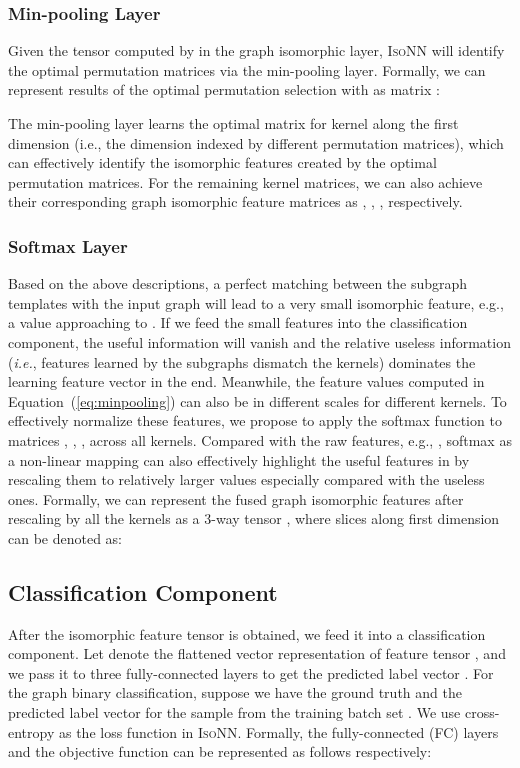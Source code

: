 \documentclass{article} \usepackage{iclr2020_conference,times}
\newcommand{\ie}[0]{\textit{i.e.}}
\newcommand{\our}{\textsc{IsoNN}}
\begin{document}
\subsubsection{Min-pooling Layer}
\vspace*{-5pt}
Given the tensor  computed by  in the graph isomorphic layer, {\our} will identify the optimal permutation matrices via the min-pooling layer. Formally, we can represent results of the optimal permutation selection with  as matrix :

The min-pooling layer learns the optimal matrix  for kernel  along the first dimension (i.e., the dimension indexed by different permutation matrices), which can effectively identify the isomorphic features created by the optimal permutation matrices. For the remaining kernel matrices, we can also achieve their corresponding graph isomorphic feature matrices as , , ,  respectively.
\vspace*{-5pt}
\subsubsection{Softmax Layer}
\vspace*{-5pt}
Based on the above descriptions, a perfect matching between the subgraph templates with the input graph will lead to a very small isomorphic feature, e.g., a value approaching to . If we feed the small features into the classification component, the useful information will vanish and the relative useless information (\ie, features learned by the subgraphs dismatch the kernels) dominates the learning feature vector in the end. Meanwhile, the feature values computed in Equation~(\ref{eq:minpooling}) can also be in different scales for different kernels. To effectively normalize these features, we propose to apply the softmax function to matrices , , ,  across all  kernels. Compared with the raw features, e.g., , softmax as a non-linear mapping can also effectively highlight the useful features in  by rescaling them to relatively larger values especially compared with the useless ones. Formally, we can represent the fused graph isomorphic features after rescaling by all the kernels as a 3-way tensor , where slices along first dimension can be denoted as:



\vspace*{-15pt} 
\subsection{Classification Component}
\vspace*{-5pt}
After the isomorphic feature tensor  is obtained, we feed it into a classification component.  Let  denote the flattened vector representation of feature tensor , and we pass it to three fully-connected layers to get the predicted label vector . For the graph binary classification, suppose we have the ground truth  and the predicted label vector  for the sample  from the training batch set . We use cross-entropy as the loss function in {\our}. Formally, the fully-connected (FC) layers and the objective function can be represented as follows respectively: 
\end{document}
